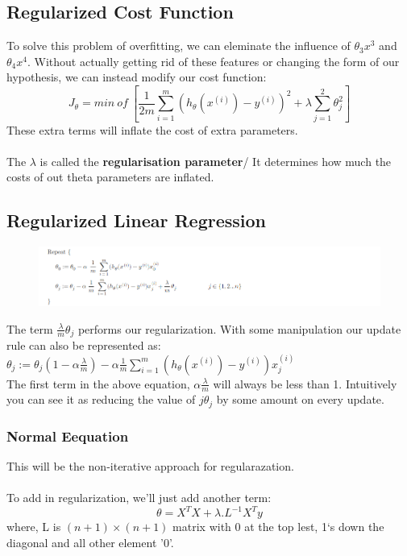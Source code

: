 \documentclass[12pt]{report}
\begin{document}
  \subsection{Regularized Cost Function}
    To solve this problem of overfitting, we can eleminate the influence of $\theta_3x^3$ and $\theta_4x^4$. Without actually getting rid of these features or changing the form of our hypothesis, we can instead modify our cost function:
    \begin{equation}
      J_\theta = min\ of\ \left[ \frac{1}{2m} \sum_{i=1}^{m}(h_\theta(x^{(i)}) - y^{(i)})^2 + \lambda\sum_{j=1}^2\theta_j^2 \right]
    \end{equation}
    These extra terms will inflate the cost of extra parameters. \\ \\
    The $\lambda$ is called the \textbf{regularisation parameter}/ It determines how much the costs of out theta parameters are inflated.

  \subsection{Regularized Linear Regression}
    \begin{figure}[h]
      \centering
      \includegraphics[scale=0.7]{gradregularize.png}
    \end{figure}


    The term $\frac{\lambda}{m}\theta_{j}$ performs our regularization. With some manipulation our update rule can also be represented as:\\

    $ \theta_j := \theta_j(1 - \alpha\frac{\lambda}{m}) - \alpha\frac{1}{m}\sum_{i=1}^m(h_\theta(x^{(i)}) - y^{(i)})x_j^{(i)} $\\

    The first term in the above equation, $\alpha\frac{\lambda}{m}$ will always be less than 1. Intuitively you can see it as reducing the value of $j\theta_j$ by some amount on every update.

    \subsubsection{Normal Eequation}
      This will be the non-iterative approach for regularazation.\\\\
      To add in regularization, we'll just add another term:
      \begin{equation}
        \theta = X^T X + \lambda . L^{-1} X^T y
      \end{equation}
      where, L is $(n+1)\times(n+1)$ matrix with 0 at the top lest, 1`s down the diagonal and all other element '0'.
\end{document}
